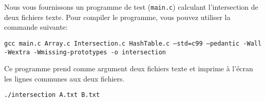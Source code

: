 \documentclass[a4paper,10pt]{article}
\begin{document}
Nous vous fournissons un programme de test (\texttt{main.c}) calculant l'intersection de deux fichiers texte.
Pour compiler le programme, vous pouvez utiliser la commande suivante:

{\small \texttt{gcc main.c Array.c Intersection.c HashTable.c --std=c99 --pedantic -Wall -Wextra -Wmissing-prototypes -o intersection}}

Ce programme prend comme argument deux fichiers texte et imprime à l'écran les lignes communes aux deux fichiers.

{\small \texttt{./intersection A.txt B.txt}}
\end{document}
